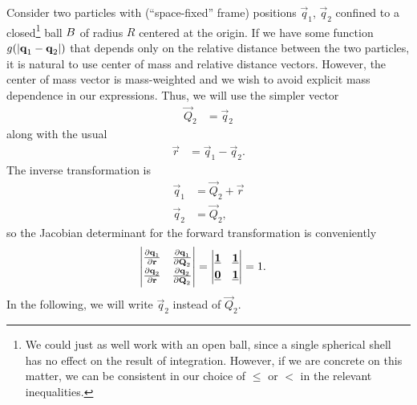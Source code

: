 Consider two particles with (``space-fixed'' frame) positions $\vec{q}_1$, $\vec{q}_2$ confined to a closed\footnote{
	We could just as well work with an open ball, since a single spherical shell has no effect on the result of integration.
	However, if we are concrete on this matter, we can be consistent in our choice of $\le$ or $<$ in the relevant inequalities.
} ball $B$ of radius $R$ centered at the origin.
If we have some function $g(\abs[0]{\bm{\mathbf{q}}_1 - \bm{\mathbf{q}}_2})$ that depends only on the relative distance between the two particles, it is natural to use center of mass and relative distance vectors.
However, the center of mass vector is mass-weighted and we wish to avoid explicit mass dependence in our expressions.
Thus, we will use the simpler vector
\begin{align}
	\vec{Q}_2
	&= \vec{q}_2
\end{align}
along with the usual
\begin{align}
	\vec{r}
	&= \vec{q}_1 - \vec{q}_2.
\end{align}
The inverse transformation is
\begin{subequations}
\begin{align}
	\vec{q}_1
	&= \vec{Q}_2 + \vec{r} \\
	\vec{q}_2
	&= \vec{Q}_2,
\end{align}
\end{subequations}
so the Jacobian determinant for the forward transformation is conveniently
\begin{align}
	\begin{vmatrix}
			\frac{\partial \bm{\mathbf{q}}_1}{\partial \bm{\mathbf{r}}} & \frac{\partial \bm{\mathbf{q}}_1}{\partial \bm{\mathbf{Q}}_2} \\[1 mm]
			\frac{\partial \bm{\mathbf{q}}_2}{\partial \bm{\mathbf{r}}} & \frac{\partial \bm{\mathbf{q}}_2}{\partial \bm{\mathbf{Q}}_2}
		\end{vmatrix}
	&= \begin{vmatrix}
			\underline{\bm{\mathbf{1}}} & \underline{\bm{\mathbf{1}}} \\[1 mm]
			\underline{\bm{\mathbf{0}}} & \underline{\bm{\mathbf{1}}}
		\end{vmatrix}
	= 1.
\end{align}
In the following, we will write $\vec{q}_2$ instead of $\vec{Q}_2$.

